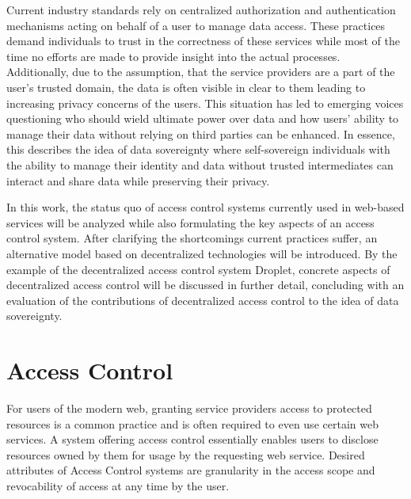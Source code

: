 \documentclass[conference]{IEEEtran}
\begin{document}
Current industry standards rely on centralized authorization and authentication mechanisms acting on behalf of a user to manage data access.
These practices demand individuals to trust in the correctness of these services while most of the time no efforts are made to provide insight into the actual processes.
Additionally, due to the assumption, that the service providers are a part of the user's trusted domain, the data is often visible in clear to them leading to increasing privacy concerns of the users.
This situation has led to emerging voices questioning who should wield ultimate power over data and how users' ability to manage their data without relying on third parties can be enhanced.
In essence, this describes the idea of data sovereignty where self-sovereign individuals with the ability to manage their identity and data without trusted intermediates can interact and share data while preserving their privacy.

In this work, the status quo of access control systems currently used in web-based services will be analyzed while also formulating the key aspects of an access control system.
After clarifying the shortcomings current practices suffer, an alternative model based on decentralized technologies will be introduced.
By the example of the decentralized access control system Droplet, concrete aspects of decentralized access control will be discussed in further detail, concluding with an evaluation of the contributions of decentralized access control to the idea of data sovereignty.

\section{Access Control}

For users of the modern web, granting service providers access to protected resources is a common practice and is often required to even use certain web services.
A system offering access control essentially enables users to disclose resources owned by them for usage by the requesting web service.
Desired attributes of Access Control systems are granularity in the access scope and revocability of access at any time by the user.
\end{document}
